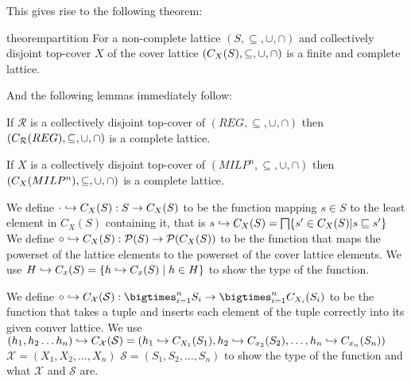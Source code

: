 This gives rise to the following theorem:

\begin{restatable}{theorem}{partition}\label{thm:partition}
    For a non-complete lattice $(S, \subseteq, \cup, \cap)$ and collectively disjoint top-cover $X$ of the cover lattice $(C_{X}(S), \subseteq, \cup, \cap)$ is a finite and complete lattice.
\end{restatable}

And the following lemmas immediately follow:

\begin{lemma}
    If $\mathcal{R}$ is a collectively disjoint top-cover of $(REG, \subseteq, \cup, \cap)$ then $(C_{\mathcal{R}}(REG), \subseteq, \cup, \cap)$ is a complete lattice.
\end{lemma}

\begin{lemma}
    If $X$ is a collectively disjoint top-cover of $(MILP^n, \subseteq, \cup, \cap)$ then $(C_{X}(MILP^n), \subseteq, \cup, \cap)$ is a complete lattice.
\end{lemma}

\begin{definition}
    We define $\cdot \hookrightarrow C_X(S):S\rightarrow C_X(S)$ to be the function mapping $s\in S$ to the least element in $C_X(S)$ containing it, that is $s \into C_X(S)=\bigsqcap\{s'\in C_X(S)|s\sqsubseteq s'\}$
    \\

    We define $\circ \hookrightarrow C_X(S):\mathcal{P}(S)\rightarrow \mathcal{P}(C_X(S))$ to be the function that maps the powerset of the lattice elements to the powerset of the cover lattice elements.
    We use $H \hookrightarrow C_x (S) = \{h \hookrightarrow C_x (S) \mid h \in H\}$ to show the type of the function.
\end{definition}

\begin{definition}
    We define $\circ \into C_\mathcal{X}(\mathcal{S}): \bigtimes_{i = 1}^{n} S_i \rightarrow \bigtimes_{i = 1}^{n} C_{X_i}(S_i)$ to be the function that takes a tuple and inserts each element of the tuple correctly into its given conver lattice.
    We use $(h_1, h_2 \dots h_n)\hookrightarrow C_{\mathcal{X}}(\mathcal{S})=(h_1 \hookrightarrow C_{X_1}(S_1), h_2\hookrightarrow C_{x_2}(S_2), \dots, h_n \hookrightarrow C_{x_n}(S_n))$
    $\mathcal{X}=(X_1, X_2, \dots, X_n)$
    $\mathcal{S}=(S_1, S_2, \dots, S_n)$ to show the type of the function and what $\mathcal{X}$ and $\mathcal{S}$ are.
\end{definition}

